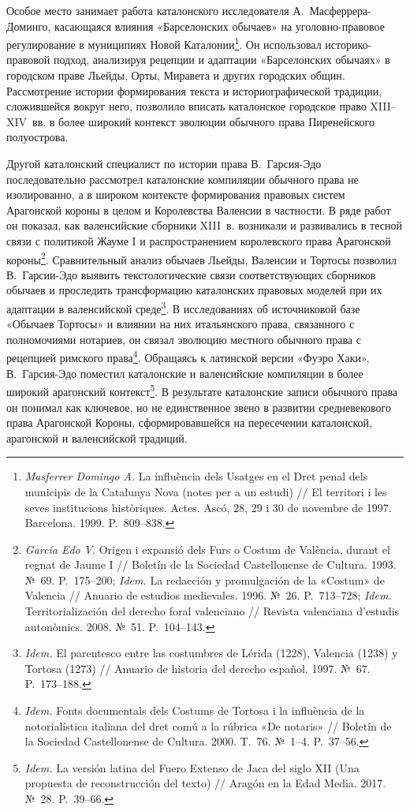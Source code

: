 Особое место занимает работа каталонского исследователя А.~Масферрера-Доминго, касающаяся влияния «Барселонских обычаев» на уголовно-правовое регулирование в муниципиях Новой Каталонии\footnote{\emph{Masferrer Domingo A.} La influència dels Usatges en el Dret penal dels municipis de la Catalunya Nova (notes per a un estudi) // El territori i les seves institucions històriques. Actes. Ascó, 28, 29 i 30 de novembre de 1997. Barcelona. 1999. P.~809--838.}. Он использовал историко-правовой подход, анализируя рецепции и адаптации «Барселонских обычаях» в городском праве Льейды, Орты, Миравета и других городских общин. Рассмотрение истории формирования текста и историографической традиции, сложившейся вокруг него, позволило вписать каталонское городское право XIII--XIV~вв. в более широкий контекст эволюции обычного права Пиренейского полуострова.

Другой каталонский специалист по истории права В.~Гарсия-Эдо последовательно рассмотрел каталонские компиляции обычного права не изолированно, а в широком контексте формирования правовых систем Арагонской короны в целом и Королевства Валенсии в частности. В ряде работ он показал, как валенсийские сборники XIII~в. возникали и развивались в тесной связи с политикой Жауме I и распространением королевского права Арагонской короны\footnote{\emph{García Edo V}. Origen i expansió dels Furs o Costum de València, durant el regnat de Jaume I // Boletín de la Sociedad Castellonense de Cultura. 1993. №~69. P.~175--200; \emph{Idem.} La redacción y promulgación de la «Costum» de Valencia // Anuario de estudios medievales. 1996. №~26. P.~713--728; \emph{Idem.} Territorialización del derecho foral valenciano // Revista valenciana d’estudis autonòmics. 2008. №~51. P.~104--143.}. Сравнительный анализ обычаев Льейды, Валенсии и Тортосы позволил В.~Гарсии-Эдо выявить текстологические связи соответствующих сборников обычаев и проследить трансформацию каталонских правовых моделей при их адаптации в валенсийской среде\footnote{\emph{Idem. }El parentesco entre las costumbres de Lérida (1228), Valencia (1238) y Tortosa (1273) // Anuario de historia del derecho español. 1997. №~67. P.~173--188.}. В исследованиях об источниковой базе «Обычаев Тортосы» и влиянии на них итальянского права, связанного с полномочиями нотариев, он связал эволюцию местного обычного права с рецепцией римского права\footnote{\emph{Idem.} Fonts documentals dels Costums de Tortosa i la influència de la notorialística italiana del dret comú a la rúbrica «De notaris» // Boletín de la Sociedad Castellonense de Cultura. 2000. T.~76. №~1--4. P.~37--56.}. Обращаясь к латинской версии «Фуэро Хаки», В.~Гарсия-Эдо поместил каталонские и валенсийские компиляции в более широкий арагонский контекст\footnote{\emph{Idem.} La versión latina del Fuero Extenso de Jaca del siglo XII (Una propuesta de reconstrucción del texto) // Aragón en la Edad Media. 2017. №~28. P.~39--66.}. В результате каталонские записи обычного права он понимал как ключевое, но не единственное звено в развитии средневекового права Арагонской Короны, сформировавшейся на пересечении каталонской, арагонской и валенсийской традиций.

